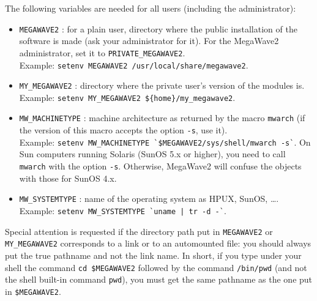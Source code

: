 The following variables are needed for all users (including the administrator):
\begin{itemize}
\item \verb+MEGAWAVE2+ : 
for a plain user, directory where the public installation of the software is made (ask your
administrator for it). For the MegaWave2 administrator, set it to \verb+PRIVATE_MEGAWAVE2+.\\
Example: \verb+setenv MEGAWAVE2 /usr/local/share/megawave2+.
\item \verb+MY_MEGAWAVE2+ : 
directory where the private user's version of the modules is. \\
Example: \verb+setenv MY_MEGAWAVE2 ${home}/my_megawave2+.
\item \verb+MW_MACHINETYPE+ : machine architecture as returned by the macro \verb+mwarch+ (if the
version of this macro accepts the option \verb+-s+, use it). \\
Example: \verb+setenv MW_MACHINETYPE `$MEGAWAVE2/sys/shell/mwarch -s`+.
On Sun computers running Solaris (SunOS 5.x or higher), you need to call \verb+mwarch+ with
the option \verb+-s+. Otherwise, MegaWave2 will confuse the objects with those for SunOS 4.x.
\item \verb+MW_SYSTEMTYPE+ : name of the operating system as HPUX, SunOS, \ldots. \\
Example: \verb+setenv MW_SYSTEMTYPE `uname | tr -d -`+.
\end{itemize}
Special attention is requested if the directory path put in \verb+MEGAWAVE2+
or \verb+MY_MEGAWAVE2+ corresponds to a link or to an automounted file: you
should always put the true pathname and not the link name. In short, if
you type under your shell the command \verb+cd $MEGAWAVE2+ followed by
the command \verb+/bin/pwd+ (and not the shell built-in command \verb+pwd+),
 you must get the same pathname as the one put in \verb+$MEGAWAVE2+.

